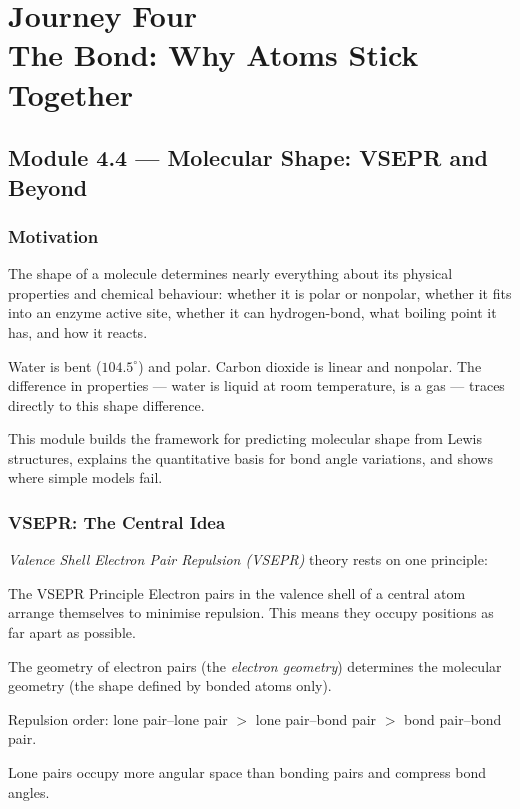 \documentclass[12pt, a4paper]{book}
\newcommand{\newterm}[1]{\textit{\textcolor{DiscoveryColor}{#1}}}
\begin{document}
\setcounter{chapter}{3}
\chapter[Journey 4 --- The Bond]{Journey Four\\[8pt]
  \textcolor{ModuleColor}{\large The Bond: Why Atoms Stick Together}}
\setcounter{section}{3}

\section{Module 4.4 --- Molecular Shape: VSEPR and Beyond}

\subsection*{Motivation}

The shape of a molecule determines nearly everything
about its physical properties and chemical behaviour:
whether it is polar or nonpolar,
whether it fits into an enzyme active site,
whether it can hydrogen-bond,
what boiling point it has,
and how it reacts.

Water is bent ($104.5^\circ$) and polar.
Carbon dioxide is linear and nonpolar.
The difference in properties --- water is liquid at room temperature,
 is a gas --- traces directly to this shape difference.

This module builds the framework for predicting molecular shape
from Lewis structures, explains the quantitative basis for
bond angle variations, and shows where simple models fail.

\subsection{VSEPR: The Central Idea}

\newterm{Valence Shell Electron Pair Repulsion (VSEPR)} theory
rests on one principle:

\begin{namedconcept}{The VSEPR Principle}
Electron pairs in the valence shell of a central atom
arrange themselves to minimise repulsion.
This means they occupy positions as far apart as possible.

The geometry of electron pairs (the \newterm{electron geometry})
determines the molecular geometry (the shape defined by
bonded atoms only).

Repulsion order: lone pair--lone pair $>$ lone pair--bond pair
$>$ bond pair--bond pair.

Lone pairs occupy more angular space than bonding pairs
and compress bond angles.
\end{namedconcept}
\end{document}
